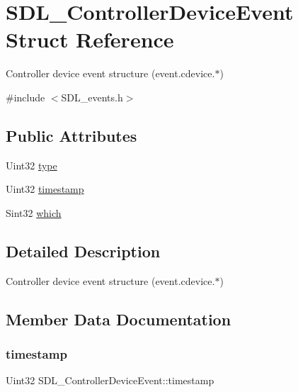 \hypertarget{struct_s_d_l___controller_device_event}{}\section{S\+D\+L\+\_\+\+Controller\+Device\+Event Struct Reference}
\label{struct_s_d_l___controller_device_event}


Controller device event structure (event.\+cdevice.$\ast$)  




{\ttfamily \#include $<$S\+D\+L\+\_\+events.\+h$>$}

\subsection*{Public Attributes}
\begin{DoxyCompactItemize}
\item 
Uint32 \mbox{\hyperlink{struct_s_d_l___controller_device_event_a45b3807eaf70a5f5cf712455da277536}{type}}
\item 
Uint32 \mbox{\hyperlink{struct_s_d_l___controller_device_event_a62945795fc17f5000fddc80e2cf921b8}{timestamp}}
\item 
Sint32 \mbox{\hyperlink{struct_s_d_l___controller_device_event_accb80de1619c1e790cffb6c888c915db}{which}}
\end{DoxyCompactItemize}


\subsection{Detailed Description}
Controller device event structure (event.\+cdevice.$\ast$) 

\subsection{Member Data Documentation}
\mbox{\label{struct_s_d_l___controller_device_event_a62945795fc17f5000fddc80e2cf921b8}} 
\subsubsection{\texorpdfstring{timestamp}{timestamp}}
{\footnotesize\ttfamily Uint32 S\+D\+L\+\_\+\+Controller\+Device\+Event\+::timestamp}

